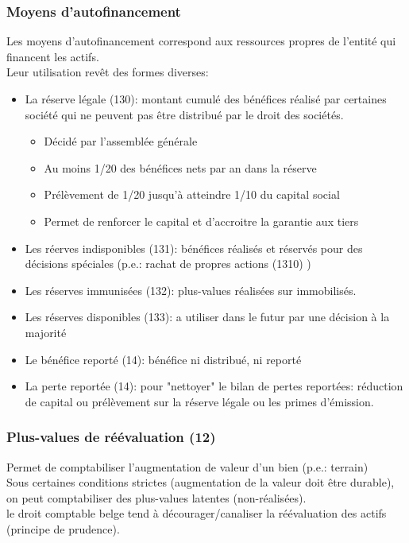 \documentclass{article}
\begin{document}
\subsubsection*{Moyens d'autofinancement}
Les moyens d'autofinancement correspond aux ressources propres de l'entité qui financent les actifs. \\
Leur utilisation revêt des formes diverses:
\begin{itemize}
    \item La réserve légale (130): montant cumulé des bénéfices réalisé par certaines société qui ne peuvent pas être distribué par le droit des sociétés.
    \begin{itemize}
        \item Décidé par l'assemblée générale
        \item Au moins 1/20 des bénéfices nets par an dans la réserve
        \item Prélèvement de 1/20 jusqu'à atteindre 1/10 du capital social
        \item Permet de renforcer le capital et d'accroitre la garantie aux tiers
    \end{itemize}
    \item Les réerves indisponibles (131): bénéfices réalisés et réservés pour des décisions spéciales (p.e.: rachat de propres actions (1310) )
    \item Les réserves immunisées (132): plus-values réalisées sur immobilisés. 
    \item Les réserves disponibles (133): a utiliser dans le futur par une décision à la majorité
    \item Le bénéfice reporté (14): bénéfice ni distribué, ni reporté
    \item La perte reportée (14): pour "nettoyer" le bilan de pertes reportées: réduction de capital ou prélèvement sur la réserve légale ou les primes d'émission. 
\end{itemize}

\subsubsection*{Plus-values de réévaluation (12)}
Permet de comptabiliser l'augmentation de valeur d'un bien (p.e.: terrain) \\
Sous certaines conditions strictes (augmentation de la valeur doit être durable), on peut comptabiliser des plus-values latentes (non-réalisées). \\
le droit comptable belge tend à décourager/canaliser la réévaluation des actifs (principe de prudence). \\
\end{document}
